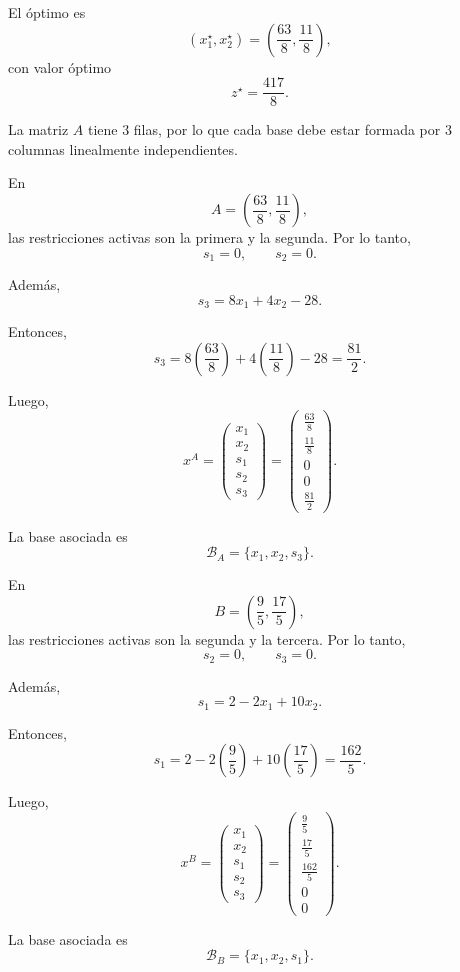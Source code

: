 El óptimo es
\[
(x_1^\star,x_2^\star)
=
\left(\frac{63}{8},\frac{11}{8}\right),
\]
con valor óptimo
\[
z^\star=\frac{417}{8}.
\]

La matriz \(A\) tiene \(3\) filas, por lo que cada base debe estar formada por
\(3\) columnas linealmente independientes.

En
\[
A=\left(\frac{63}{8},\frac{11}{8}\right),
\]
las restricciones activas son la primera y la segunda. Por lo tanto,
\[
s_1=0,
\qquad
s_2=0.
\]

Además,
\[
s_3=8x_1+4x_2-28.
\]

Entonces,
\[
s_3
=
8\left(\frac{63}{8}\right)
+
4\left(\frac{11}{8}\right)
-
28
=
\frac{81}{2}.
\]

Luego,
\[
x^A=
\begin{pmatrix}
x_1\\
x_2\\
s_1\\
s_2\\
s_3
\end{pmatrix}
=
\begin{pmatrix}
\frac{63}{8}\\
\frac{11}{8}\\
0\\
0\\
\frac{81}{2}
\end{pmatrix}.
\]

La base asociada es
\[
\mathcal{B}_A=\{x_1,x_2,s_3\}.
\]

En
\[
B=\left(\frac{9}{5},\frac{17}{5}\right),
\]
las restricciones activas son la segunda y la tercera. Por lo tanto,
\[
s_2=0,
\qquad
s_3=0.
\]

Además,
\[
s_1=2-2x_1+10x_2.
\]

Entonces,
\[
s_1
=
2
-
2\left(\frac{9}{5}\right)
+
10\left(\frac{17}{5}\right)
=
\frac{162}{5}.
\]

Luego,
\[
x^B=
\begin{pmatrix}
x_1\\
x_2\\
s_1\\
s_2\\
s_3
\end{pmatrix}
=
\begin{pmatrix}
\frac{9}{5}\\
\frac{17}{5}\\
\frac{162}{5}\\
0\\
0
\end{pmatrix}.
\]

La base asociada es
\[
\mathcal{B}_B=\{x_1,x_2,s_1\}.
\]

